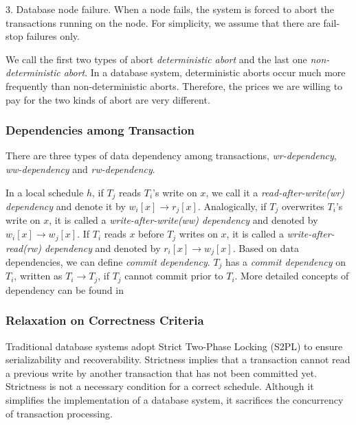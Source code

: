 \documentclass[conference]{IEEEtran}
\begin{document}
3. Database node failure.
When a node fails, the system is forced to abort the transactions running on the node. For simplicity, we assume that there are fail-stop failures only.

We call the first two types of abort \emph{deterministic abort} and the last one \emph{non-deterministic abort}.
In a database system, deterministic aborts occur much more frequently than non-deterministic aborts.
Therefore, the prices we are willing to pay for the two kinds of abort are very different.

\subsubsection{Dependencies among Transaction}

There are three types of data dependency among transactions,
\emph{wr-dependency},
\emph{ww-dependency}
and \emph{rw-dependency}.

In a local schedule ${h}$, if ${T_j}$ reads ${T_i}$'s write on ${x}$,
we call it a \emph{read-after-write(wr) dependency} and denote it by ${w_i[x] \rightarrow r_j[x]}$.
Analogically, if ${T_j}$ overwrites ${T_i}$'s write on ${x}$, it is called a \emph{write-after-write(ww) dependency} and denoted by ${w_i[x] \rightarrow w_j[x]}$.
If ${T_i}$ reads ${x}$ before ${T_j}$ writes on ${x}$, it is called a \emph{write-after-read(rw) dependency} and denoted by ${r_i[x] \rightarrow w_j[x]}$.
Based on data dependencies, we can define \emph{commit dependency}. ${T_j}$ has a \emph{commit dependency} on ${T_i}$, written as ${T_i \rightarrow T_j}$, if ${T_j}$ cannot commit prior to ${T_i}$.
More detailed concepts of dependency can be found in \cite{Dependency:conf/sigmod/ChrysanthisR90} \cite{Dependency:conf/sigmod/BilirisDGJR94}

\subsubsection{Relaxation on Correctness Criteria}

Traditional database systems adopt Strict Two-Phase Locking (S2PL) \cite{DBLP:conf/vldb/Raz92} to ensure serializability and recoverability.
Strictness implies that a transaction cannot read a previous write by another transaction that has not been committed yet.
Strictness is not a necessary condition for a correct schedule.
Although it simplifies the implementation of a database system, it sacrifices the concurrency of transaction processing.
\end{document}
